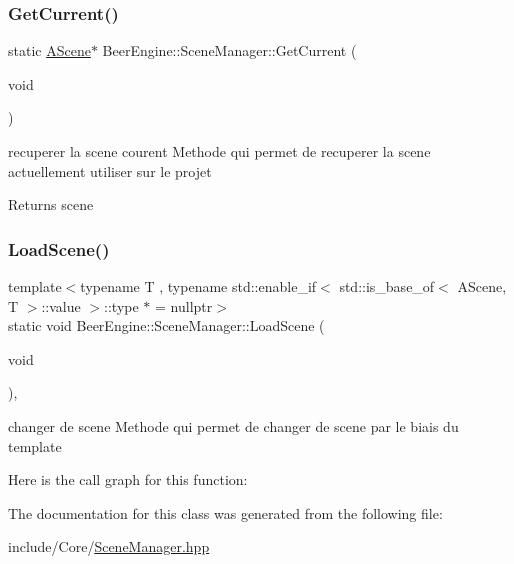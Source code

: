 \subsubsection{\texorpdfstring{Get\+Current()}{GetCurrent()}}
{\footnotesize\ttfamily static \mbox{\hyperlink{class_beer_engine_1_1_a_scene}{A\+Scene}}$\ast$ Beer\+Engine\+::\+Scene\+Manager\+::\+Get\+Current (\begin{DoxyParamCaption}\item[{void}]{ }\end{DoxyParamCaption})\hspace{0.3cm}{\ttfamily [static]}}



recuperer la scene courent Methode qui permet de recuperer la scene actuellement utiliser sur le projet 

\begin{DoxyReturn}{Returns}
scene 
\end{DoxyReturn}
\mbox{\label{class_beer_engine_1_1_scene_manager_a9414ed3c9d4a170e198afe83d15db360}} 
\subsubsection{\texorpdfstring{Load\+Scene()}{LoadScene()}}
{\footnotesize\ttfamily template$<$typename T , typename std\+::enable\+\_\+if$<$ std\+::is\+\_\+base\+\_\+of$<$ A\+Scene, T $>$\+::value $>$\+::type $\ast$  = nullptr$>$ \\
static void Beer\+Engine\+::\+Scene\+Manager\+::\+Load\+Scene (\begin{DoxyParamCaption}\item[{void}]{ }\end{DoxyParamCaption})\hspace{0.3cm}{\ttfamily [inline]}, {\ttfamily [static]}}



changer de scene Methode qui permet de changer de scene par le biais du template 

Here is the call graph for this function\+:


The documentation for this class was generated from the following file\+:\begin{DoxyCompactItemize}
\item 
include/\+Core/\mbox{\hyperlink{_scene_manager_8hpp}{Scene\+Manager.\+hpp}}\end{DoxyCompactItemize}
